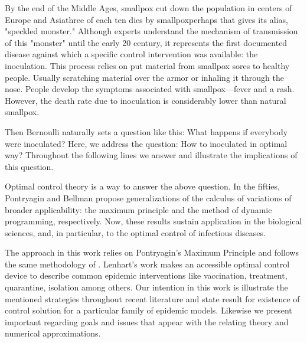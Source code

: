   By the end of the Middle Ages, smallpox cut down the 
population in centers of Europe and Asia\textemdash three of each ten dies by 
smallpox\textemdash perhaps that gives its alias, "speckled monster."  
Although experts understand the mechanism of transmission of this  "monster"
until the early 20  century, it represents the first documented disease
\citep[][]{bernoulli1760essai, bradley1971smallpox, Foppa2017} against which a
specific control intervention was available: the inoculation. This process
relies on put material from smallpox sores to healthy people. Usually scratching
material over the armor or inhaling it through the nose. People develop the
symptoms associated with smallpox---fever and a rash. However, the death rate
due to inoculation is considerably lower than natural smallpox.

  Then Bernoulli naturally sets a question like this: What happens if everybody
were inoculated? Here, we address the question: How to inoculated in optimal
way? Throughout the following lines we answer and illustrate the implications
of this question. 

  Optimal control theory is a way to answer the above question.  In the
fifties, Pontryagin and Bellman propose generalizations of the calculus of
variations of broader applicability:  the maximum principle and the method of
dynamic programming, respectively. Now, these results sustain application in the
biological sciences, and, in particular, to the optimal control
of infectious diseases.

  The approach in this work relies on Pontryagin's Maximum
Principle \cite{Boltyanski1960} and follows the same methodology of
\citet{lenhart2007optimal}. Lenhart's work makes an accessible optimal control
device to describe common epidemic interventions like vaccination, treatment,
quarantine, isolation among others. Our intention in this work is illustrate
the mentioned strategies throughout recent literature and state result for
existence of control solution for a particular family of epidemic models.
Likewise we present  important regarding goals and issues that appear with the
relating theory and numerical approximations. 

























